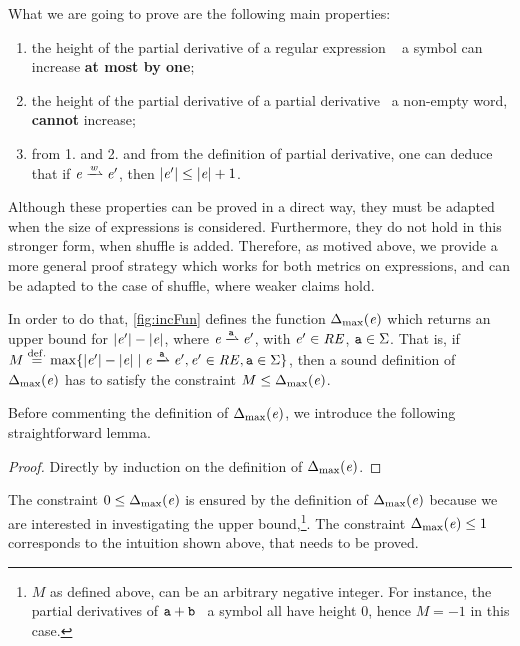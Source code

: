 What we are going to prove are the following main properties:
\begin{enumerate}
 \item the height of the partial derivative of a regular expression \wrt~ a symbol can increase \textbf{at most by one};
 \item the height of the partial derivative of a partial derivative \wrt~a non-empty word, \textbf{cannot} increase;
 \item from 1. and 2. and from the definition of partial derivative, one can deduce that if $\re\parDer{\word}\re'$, then ${\mid}{\mathit {e}'}{\mid}\leq{\mid}{\ensuremath{\mathit {e}}}{\mid}+1$.
\end{enumerate}
Although these properties can be proved in a direct way, they must be adapted when the size of expressions is considered.
Furthermore, they do not hold in this stronger form, when shuffle is added. Therefore, as motived above, we provide a more general proof strategy which works for both metrics on expressions, and can be adapted to the case of shuffle, where weaker claims hold.

In order to do that, \cref{fig:incFun} defines the function ${\Delta_{\max}}({\mathit {e}})$ which returns an upper bound for ${\mid}{\mathit {e}'}{\mid}-{\mid}{\mathit {e}}{\mid}$, where
$\re\parDer{\sym}\re'$, with $\mathit {e}'\in\mathit {RE}$, $\mathtt {a}\in\Sigma$.
That is, if $M\stackrel{\mathrm{def.}}{=}\max\{\theight{\re'}-\theight{\re} \mid \re\parDer{\sym}\re', \re'\in\reSet, \sym\in\symAlph\}$, then
a sound definition of ${\Delta_{\max}}({\mathit {e}})$ has to satisfy the constraint $M\leq{\Delta_{\max}}({\mathit {e}})$.

Before commenting the definition of ${\Delta_{\max}}({\mathit {e}})$, we introduce the following straightforward lemma.
\begin{proof}
 Directly by induction on the definition of ${\Delta_{\max}}({\mathit {e}})$.
\end{proof}

The constraint $0\leq{\Delta_{\max}}({\mathit {e}})$ is ensured by the definition of ${\Delta_{\max}}({\mathit {e}})$ because we are interested in investigating the upper bound,\footnote{$M$ as defined above, can be an arbitrary negative integer. For instance, the partial derivatives of $\mathtt {a}\mathbin{+}\mathtt {b}$ \wrt~a symbol all have height 0, hence $M=-1$ in this case.}. The constraint ${\Delta_{\max}}({\mathit {e}})\leq 1$ corresponds to the intuition shown above, that needs to be proved.

